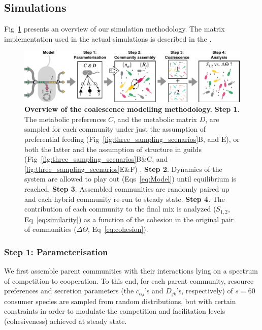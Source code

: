 \documentclass[10pt,letterpaper]{article}
\begin{document}
\subsection*{Simulations}

Fig~\ref{fig:work_flow} presents an overview of our simulation methodology. The matrix implementation used in the actual simulations is described in the . %
\begin{figure}[t]
\begin{adjustwidth}{-2.2in}{0in}
    \centering
    \includegraphics[width=1.40\columnwidth]{hand_plot_flow.pdf}
    \vspace{15pt}
    \caption{\textbf{Overview of the coalescence modelling methodology.} \textbf{Step 1}. The metabolic preferences $C$, and the metabolic matrix $D$, are sampled for each community under just the assumption of preferential feeding (Fig~\ref{fig:three_sampling_scenarios}B, and E), or both the latter and the assumption of structure in guilds (Fig~\ref{fig:three_sampling_scenarios}B\&C, and \ref{fig:three_sampling_scenarios}E\&F) . \textbf{Step 2}. Dynamics of the system are allowed to play out (Eqs~\ref{eq:Model}) until equilibrium is reached.\textbf{ Step 3}. Assembled communities are randomly paired up and each hybrid community re-run to steady state. \textbf{Step 4}. The contribution of each community to the final mix is analyzed ($S_{1, 2}$, Eq~\ref{eq:similarity}) as a function of the cohesion in the original pair of communities ($\Delta\Theta$, Eq~\ref{eq:cohesion}).}
    \label{fig:work_flow}
\end{adjustwidth}
\end{figure}


\subsubsection*{Step 1: Parameterisation}\label{Step1}\vspace{-5pt}

We first assemble parent communities with their interactions lying on a spectrum of competition to cooperation. To this end, for each parent community, resource preferences and secretion parameters (the $ c_{\alpha j} $'s and $ D_{jk} $'s, respectively) of $s = 60$ consumer species are sampled from random distributions, but with certain constraints in order to modulate the competition and facilitation levels (cohesiveness) achieved at steady state.
\end{document}
